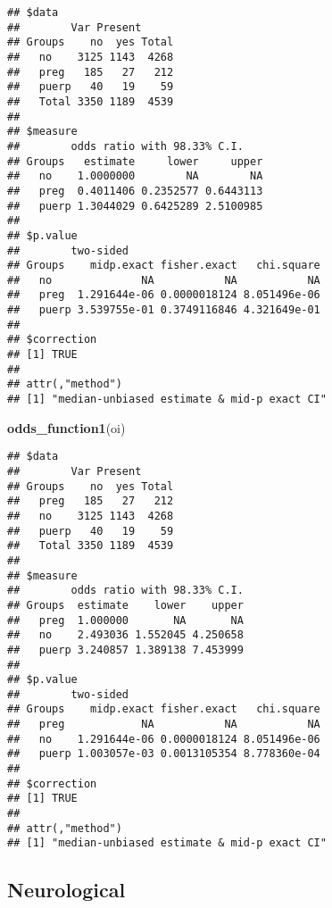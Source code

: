 \documentclass[
]{article}
\newenvironment{Shaded}{\begin{snugshade}}{\end{snugshade}}
\newcommand{\KeywordTok}[1]{\textcolor[rgb]{0.13,0.29,0.53}{\textbf{#1}}}
\newcommand{\NormalTok}[1]{#1}
\newcommand{\OperatorTok}[1]{\textcolor[rgb]{0.81,0.36,0.00}{\textbf{#1}}}
\newcommand{\StringTok}[1]{\textcolor[rgb]{0.31,0.60,0.02}{#1}}
\begin{document}
\begin{verbatim}
## $data
##        Var Present
## Groups    no  yes Total
##   no    3125 1143  4268
##   preg   185   27   212
##   puerp   40   19    59
##   Total 3350 1189  4539
## 
## $measure
##        odds ratio with 98.33% C.I.
## Groups   estimate     lower     upper
##   no    1.0000000        NA        NA
##   preg  0.4011406 0.2352577 0.6443113
##   puerp 1.3044029 0.6425289 2.5100985
## 
## $p.value
##        two-sided
## Groups    midp.exact fisher.exact   chi.square
##   no              NA           NA           NA
##   preg  1.291644e-06 0.0000018124 8.051496e-06
##   puerp 3.539755e-01 0.3749116846 4.321649e-01
## 
## $correction
## [1] TRUE
## 
## attr(,"method")
## [1] "median-unbiased estimate & mid-p exact CI"
\end{verbatim}

\begin{Shaded}
\begin{Highlighting}[]
\KeywordTok{odds_function1}\NormalTok{(oi)}
\end{Highlighting}
\end{Shaded}

\begin{verbatim}
## $data
##        Var Present
## Groups    no  yes Total
##   preg   185   27   212
##   no    3125 1143  4268
##   puerp   40   19    59
##   Total 3350 1189  4539
## 
## $measure
##        odds ratio with 98.33% C.I.
## Groups  estimate    lower    upper
##   preg  1.000000       NA       NA
##   no    2.493036 1.552045 4.250658
##   puerp 3.240857 1.389138 7.453999
## 
## $p.value
##        two-sided
## Groups    midp.exact fisher.exact   chi.square
##   preg            NA           NA           NA
##   no    1.291644e-06 0.0000018124 8.051496e-06
##   puerp 1.003057e-03 0.0013105354 8.778360e-04
## 
## $correction
## [1] TRUE
## 
## attr(,"method")
## [1] "median-unbiased estimate & mid-p exact CI"
\end{verbatim}

\hypertarget{neurological}{%
\subsection{Neurological}\label{neurological}}

\begin{Shaded}
\end{Shaded}
\end{document}
